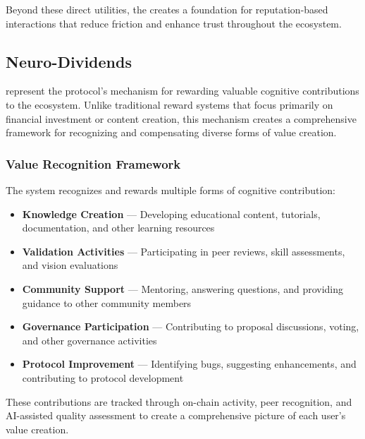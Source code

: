 Beyond these direct utilities, the  creates a foundation for reputation-based interactions that reduce friction and enhance trust throughout the ecosystem.

\subsection{Neuro-Dividends\texttrademark}

 represent the protocol's mechanism for rewarding valuable cognitive contributions to the ecosystem. Unlike traditional reward systems that focus primarily on financial investment or content creation, this mechanism creates a comprehensive framework for recognizing and compensating diverse forms of value creation.

\subsubsection*{Value Recognition Framework}

The  system recognizes and rewards multiple forms of cognitive contribution:

\begin{itemize}
    \item \textbf{Knowledge Creation} — Developing educational content, tutorials, documentation, and other learning resources
    
    \item \textbf{Validation Activities} — Participating in peer reviews, skill assessments, and vision evaluations
    
    \item \textbf{Community Support} — Mentoring, answering questions, and providing guidance to other community members
    
    \item \textbf{Governance Participation} — Contributing to proposal discussions, voting, and other governance activities
    
    \item \textbf{Protocol Improvement} — Identifying bugs, suggesting enhancements, and contributing to protocol development
\end{itemize}

These contributions are tracked through on-chain activity, peer recognition, and AI-assisted quality assessment to create a comprehensive picture of each user's value creation.

